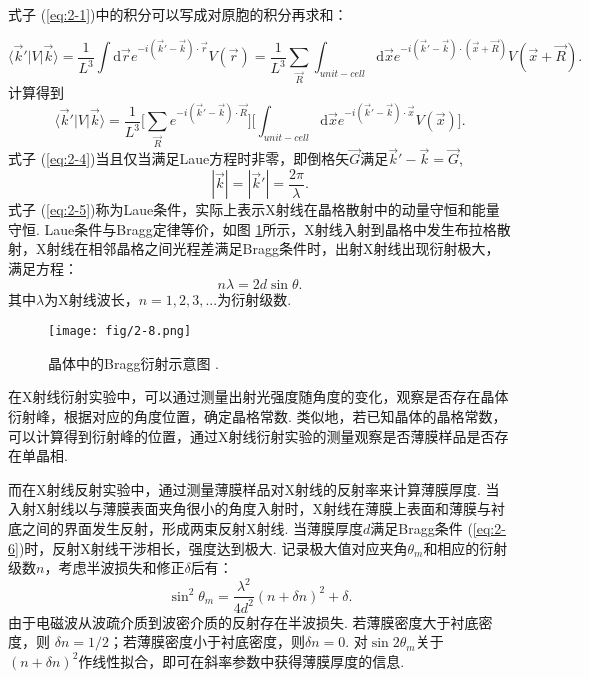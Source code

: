 \documentclass[12pt,a4paper,openany,twoside,UTF-8]{book}
\begin{document}
式子 (\ref{eq:2-1})中的积分可以写成对原胞的积分再求和：

\begin{equation}
\langle \vec{k}'|V|\vec{k}\rangle=\frac{1}{L^3}\int\mathrm{d}\vec{r}e^{-i(\vec{k}'-\vec{k})\cdot\vec{r}}V(\vec{r})=\frac{1}{L^3}\sum_{\vec{R}}\int_{unit-cell}\mathrm{d}\vec{x}e^{-i(\vec{k}'-\vec{k})\cdot(\vec{x}+\vec{R})}V(\vec{x}+\vec{R}).
\label{eq:2-3}
\end{equation}
计算得到
\begin{equation}
\langle \vec{k}'|V|\vec{k}\rangle=\frac{1}{L^3}\Big[\sum_{\vec{R}}e^{-i(\vec{k}'-\vec{k})\cdot\vec{R}}\Big]\Big[\int_{unit-cell}\mathrm{d}\vec{x}e^{-i(\vec{k}'-\vec{k})\cdot\vec{x}}V(\vec{x})\Big].
\label{eq:2-4}
\end{equation}
式子 (\ref{eq:2-4})当且仅当满足Laue方程时非零，即倒格矢$\vec{G}$满足$\vec{k}'-\vec{k}=\vec{G}$,
\begin{equation}
|\vec{k}|=|\vec{k}'|=\frac{2\pi}{\lambda}.
\label{eq:2-5}
\end{equation}
式子 (\ref{eq:2-5})称为Laue条件，实际上表示X射线在晶格散射中的动量守恒和能量守恒. Laue条件与Bragg定律等价，如图 \ref{fig:2-8}所示，X射线入射到晶格中发生布拉格散射，X射线在相邻晶格之间光程差满足Bragg条件时，出射X射线出现衍射极大，满足方程：
\begin{equation}
n\lambda = 2d\sin\theta.
\label{eq:2-6}
\end{equation}
其中$\lambda$为X射线波长，$n = 1, 2, 3, ...$为衍射级数.

\begin{figure}[htbp]
\centering
\texttt{[image: fig/2-8.png]}
\caption{晶体中的Bragg衍射示意图 \cite{ref26}.}
\label{fig:2-8} 
\end{figure}

在X射线衍射实验中，可以通过测量出射光强度随角度的变化，观察是否存在晶体衍射峰，根据对应的角度位置，确定晶格常数. 类似地，若已知晶体的晶格常数，可以计算得到衍射峰的位置，通过X射线衍射实验的测量观察是否薄膜样品是否存在单晶相.

而在X射线反射实验中，通过测量薄膜样品对X射线的反射率来计算薄膜厚度. 当入射X射线以与薄膜表面夹角很小的角度入射时，X射线在薄膜上表面和薄膜与衬底之间的界面发生反射，形成两束反射X射线. 当薄膜厚度$d$满足Bragg条件 (\ref{eq:2-6})时，反射X射线干涉相长，强度达到极大. 记录极大值对应夹角$\theta_m$和相应的衍射级数$n$，考虑半波损失和修正$\delta$后有\cite{ref27, ref28}：
\begin{equation}
\sin^2\theta_m = \frac{\lambda^2}{4d^2}(n+\delta n)^2+\delta.
\label{eq:2-7}
\end{equation}
由于电磁波从波疏介质到波密介质的反射存在半波损失. 若薄膜密度大于衬底密度，则 $\delta n = 1/2$；若薄膜密度小于衬底密度，则$\delta n = 0$. 对$\sin2\theta_m$关于$(n+\delta n)^2$作线性拟合，即可在斜率参数中获得薄膜厚度的信息.
\end{document}
